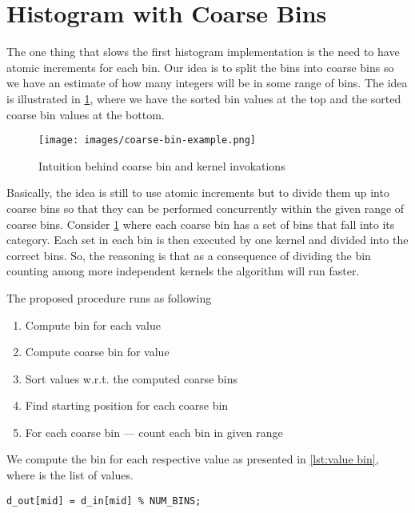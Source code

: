 \section{Histogram with Coarse Bins}
\label{sec:coarse bin histogram}

The one thing that slows the first histogram implementation is the need to have atomic increments for each bin.
Our idea is to split the bins into coarse bins so we have an estimate of how many integers will be in some range of bins.
The idea is illustrated in \cref{fig:coarse bins example}, where we have the sorted bin values at the top and the sorted coarse bin values at the bottom.

\begin{figure}[htb]
  \centering
  \texttt{[image: images/coarse-bin-example.png]}
  \caption{Intuition behind coarse bin and kernel invokations}
  \label{fig:coarse bins example}
\end{figure}

Basically, the idea is still to use atomic increments but to divide them up into coarse bins so that they can be performed concurrently within the given range of coarse bins.
Consider \cref{fig:coarse bins example} where each coarse bin has a set of bins that fall into its category.
Each set in each bin is then executed by one kernel and divided into the correct bins.
So, the reasoning is that as a consequence of dividing the bin counting among more independent kernels the algorithm will run faster.

The proposed procedure runs as following
%
\begin{enumerate}
  \item Compute bin for each value
  \item Compute coarse bin for value
  \item Sort values w.r.t. the computed coarse bins
  \item Find starting position for each coarse bin
  \item For each coarse bin --- count each bin in given range
\end{enumerate}
%
We compute the bin for each respective value as presented in \cref{lst:value bin}, where  is the list of values.

\begin{lstlisting}[caption={compute each value's bin}, label={lst:value bin}, numbers=none]
d_out[mid] = d_in[mid] % NUM_BINS;
\end{lstlisting}


